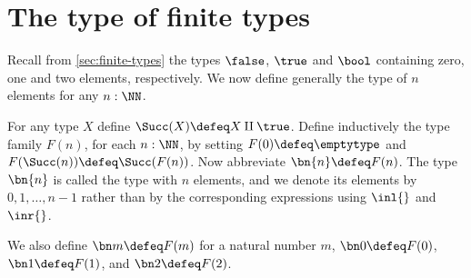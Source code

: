 \section{The type of finite types}
\label{sec:typeFin}
Recall from \cref{sec:finite-types} the types
$\false$, $\true$ and $\bool$ containing zero, one and two
elements, respectively. We now define generally the
type of $n$ elements for any $n:\NN$.

\begin{definition}\label{def:finiteset}
For any type $X$ define $\Succ(X)\defeq X\amalg\true$.
Define inductively the type family $F(n)$, for each $n:\NN$, by
setting $F(0)\defeq\emptytype$ and $F(\Succ(n))\defeq\Succ(F(n))$.
Now abbreviate $\bn{n}\defeq F(n)$. The type $\bn{n}$ is called
the type with $n$ elements, and we denote its elements
by $0,1,\ldots,n-1$ rather than by the corresponding expressions
using $\inl{}$ and $\inr{}$.

We also define $\bn m \defeq F(m)$ for a natural number $m$, $\bn 0 \defeq F(0)$, $\bn 1 \defeq F(1)$, and $\bn 2 \defeq F(2)$.
\end{definition}

